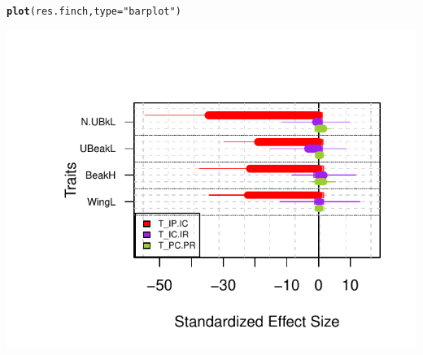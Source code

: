 \documentclass[12pt]{article}\usepackage[]{graphicx}\usepackage[]{color}
\makeatletter
\def\maxwidth{ %
  \ifdim\Gin@nat@width>\linewidth
    \linewidth
  \else
    \Gin@nat@width
  \fi
}
\newcommand{\hlstr}[1]{\textcolor[rgb]{0.192,0.494,0.8}{#1}}%
\newcommand{\hlstd}[1]{\textcolor[rgb]{0.345,0.345,0.345}{#1}}%
\newcommand{\hlkwc}[1]{\textcolor[rgb]{0.333,0.667,0.333}{#1}}%
\newcommand{\hlkwd}[1]{\textcolor[rgb]{0.737,0.353,0.396}{\textbf{#1}}}%
\newenvironment{kframe}{%
 \def\at@end@of@kframe{}%
 \ifinner\ifhmode%
  \def\at@end@of@kframe{\end{minipage}}%
  \begin{minipage}{\columnwidth}%
 \fi\fi%
 \def\FrameCommand##1{\hskip\@totalleftmargin \hskip-\fboxsep
 \colorbox{shadecolor}{##1}\hskip-\fboxsep
     \hskip-\linewidth \hskip-\@totalleftmargin \hskip\columnwidth}%
 \MakeFramed {\advance\hsize-\width
   \@totalleftmargin\z@ \linewidth\hsize
   \@setminipage}}%
 {\par\unskip\endMakeFramed%
 \at@end@of@kframe}
\newenvironment{knitrout}{}{} %
\makeatother
\begin{document}
\begin{knitrout}
{}


\begin{kframe}\begin{alltt}
\hlkwd{plot}\hlstd{(res.finch,} \hlkwc{type} \hlstd{=} \hlstr{"barplot"}\hlstd{)}
\end{alltt}
\end{kframe}

{\centering \includegraphics[width=\maxwidth]{figure/unnamed-chunk-353} 

}



\end{knitrout}
\end{document}
